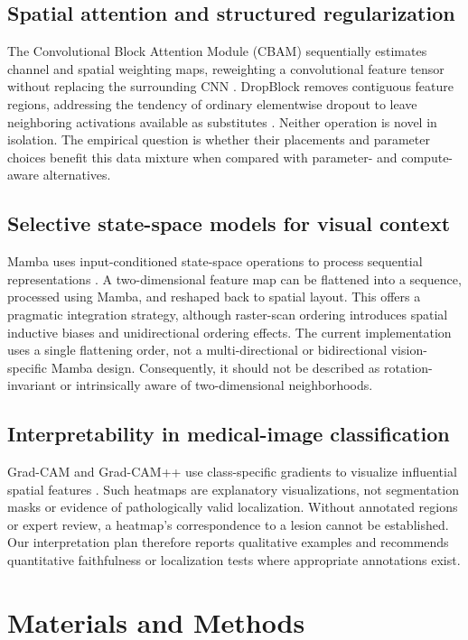 \documentclass[11pt,a4paper]{article}
\begin{document}
\subsection{Spatial attention and structured regularization}
The Convolutional Block Attention Module (CBAM) sequentially estimates channel and spatial weighting maps, reweighting a convolutional feature tensor without replacing the surrounding CNN \citep{woo2018cbam}. DropBlock removes contiguous feature regions, addressing the tendency of ordinary elementwise dropout to leave neighboring activations available as substitutes \citep{ghiasi2018dropblock}. Neither operation is novel in isolation. The empirical question is whether their placements and parameter choices benefit this data mixture when compared with parameter- and compute-aware alternatives.

\subsection{Selective state-space models for visual context}
Mamba uses input-conditioned state-space operations to process sequential representations \citep{gu2023mamba}. A two-dimensional feature map can be flattened into a sequence, processed using Mamba, and reshaped back to spatial layout. This offers a pragmatic integration strategy, although raster-scan ordering introduces spatial inductive biases and unidirectional ordering effects. The current implementation uses a single flattening order, not a multi-directional or bidirectional vision-specific Mamba design. Consequently, it should not be described as rotation-invariant or intrinsically aware of two-dimensional neighborhoods.

\subsection{Interpretability in medical-image classification}
Grad-CAM and Grad-CAM++ use class-specific gradients to visualize influential spatial features \citep{selvaraju2017gradcam,chattopadhyay2018gradcampp}. Such heatmaps are explanatory visualizations, not segmentation masks or evidence of pathologically valid localization. Without annotated regions or expert review, a heatmap's correspondence to a lesion cannot be established. Our interpretation plan therefore reports qualitative examples and recommends quantitative faithfulness or localization tests where appropriate annotations exist.

\section{Materials and Methods}\label{sec:methods}
\end{document}
